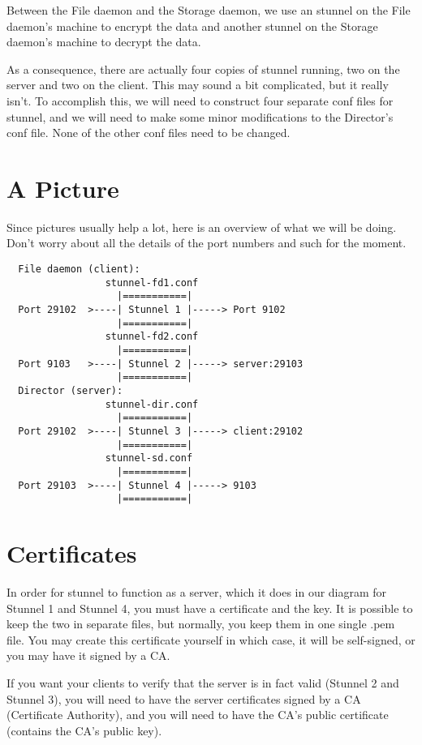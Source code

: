 Between the File daemon and the Storage daemon, we use an stunnel on the File
daemon's machine to encrypt the data and another stunnel on the Storage
daemon's machine to decrypt the data.

As a consequence, there are actually four copies of stunnel running, two on the
server and two on the client. This may sound a bit complicated, but it really
isn't. To accomplish this, we will need to construct four separate conf files
for stunnel, and we will need to make some minor modifications to the
Director's conf file. None of the other conf files need to be changed.

\section{A Picture}

Since pictures usually help a lot, here is an overview of what we will be
doing. Don't worry about all the details of the port numbers and such for the
moment.

\footnotesize
\begin{verbatim}
  File daemon (client):
                 stunnel-fd1.conf
                   |===========|
  Port 29102  >----| Stunnel 1 |-----> Port 9102
                   |===========|
                 stunnel-fd2.conf
                   |===========|
  Port 9103   >----| Stunnel 2 |-----> server:29103
                   |===========|
  Director (server):
                 stunnel-dir.conf
                   |===========|
  Port 29102  >----| Stunnel 3 |-----> client:29102
                   |===========|
                 stunnel-sd.conf
                   |===========|
  Port 29103  >----| Stunnel 4 |-----> 9103
                   |===========|
\end{verbatim}
\normalsize

\section{Certificates}

In order for stunnel to function as a server, which it does in our diagram for
Stunnel 1 and Stunnel 4, you must have a certificate and the key. It is
possible to keep the two in separate files, but normally, you keep them in one
single .pem file. You may create this certificate yourself in which case, it
will be self-signed, or you may have it signed by a CA.

If you want your clients to verify that the server is in fact valid (Stunnel 2
and Stunnel 3), you will need to have the server certificates signed by a CA
(Certificate Authority), and you will need to have the CA's public certificate
(contains the CA's public key).


